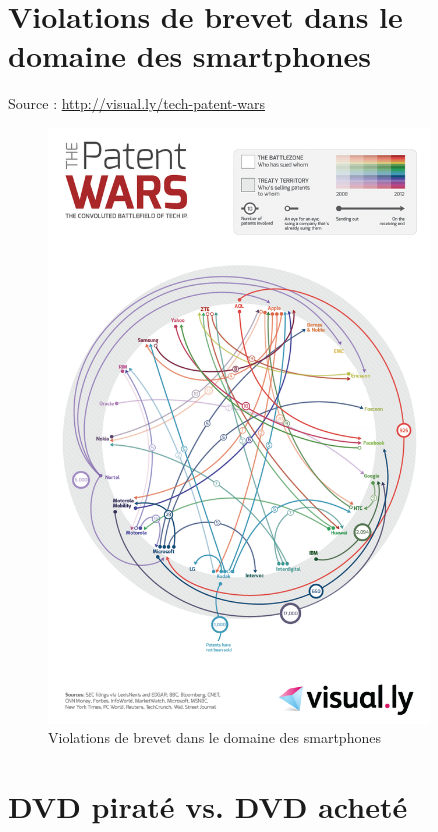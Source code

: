 \chapter{Violations de brevet dans le domaine des smartphones}
\label{annexe-smartphones}

Source : \url{http://visual.ly/tech-patent-wars}

\newpage

\begin{figure}[H]
\center
\includegraphics[width=0.9\textwidth]{images/patent-wars.png}
\caption{Violations de brevet dans le domaine des smartphones}
\end{figure}

\chapter{DVD piraté vs. DVD acheté}
\label{annexe-dvd}

